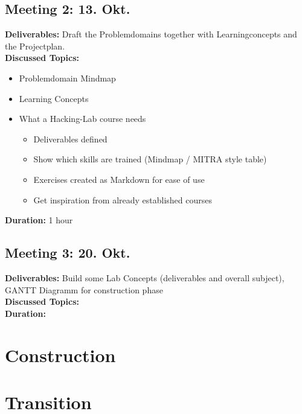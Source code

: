 \subsection*{Meeting 2: 13. Okt.}
\textbf{Deliverables:} Draft the Problemdomains together with Learningconcepts and the Projectplan. \\
\textbf{Discussed Topics:} 
\begin{itemize}
    \item Problemdomain Mindmap
    \item Learning Concepts
    \item What a Hacking-Lab course needs
    \begin{itemize}
        \item Deliverables defined
        \item Show which skills are trained (Mindmap / MITRA style table)
        \item Exercises created as Markdown for ease of use 
        \item Get inspiration from already established courses
    \end{itemize}
\end{itemize}
\textbf{Duration:} 1 hour

\subsection*{Meeting 3: 20. Okt.}
\textbf{Deliverables:} Build some Lab Concepts (deliverables and overall subject), GANTT Diagramm for construction phase\\
\textbf{Discussed Topics:} \\
\textbf{Duration:}

\section{Construction}

\section{Transition}

